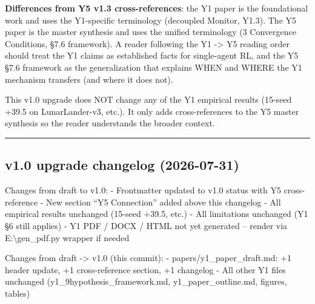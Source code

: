 \documentclass[
]{article}
\begin{document}
\textbf{Differences from Y5 v1.3 cross-references}: the Y1 paper is the
foundational work and uses the Y1-specific terminology (decoupled
Monitor, Y1.3). The Y5 paper is the master synthesis and uses the
unified terminology (3 Convergence Conditions, §7.6 framework). A reader
following the Y1 -\textgreater{} Y5 reading order should treat the Y1
claims as established facts for single-agent RL, and the Y5 §7.6
framework as the generalization that explains WHEN and WHERE the Y1
mechanism transfers (and where it does not).

This v1.0 upgrade does NOT change any of the Y1 empirical results
(15-seed +39.5 on LunarLander-v3, etc.). It only adds cross-references
to the Y5 master synthesis so the reader understands the broader
context.

\begin{center}\rule{0.5\linewidth}{0.5pt}\end{center}

\subsection{v1.0 upgrade changelog
(2026-07-31)}\label{v1.0-upgrade-changelog-2026-07-31}

Changes from draft to v1.0: - Frontmatter updated to v1.0 status with Y5
cross-reference - New section ``Y5 Connection'' added above this
changelog - All empirical results unchanged (15-seed +39.5, etc.) - All
limitations unchanged (Y1 §6 still applies) - Y1 PDF / DOCX / HTML not
yet generated -- render via E:\textbackslash gen\_pdf.py wrapper if
needed

Changes from draft -\textgreater{} v1.0 (this commit): -
papers/y1\_paper\_draft.md: +1 header update, +1 cross-reference
section, +1 changelog - All other Y1 files unchanged
(y1\_9hypothesis\_framework.md, y1\_paper\_outline.md, figures, tables)
\end{document}
